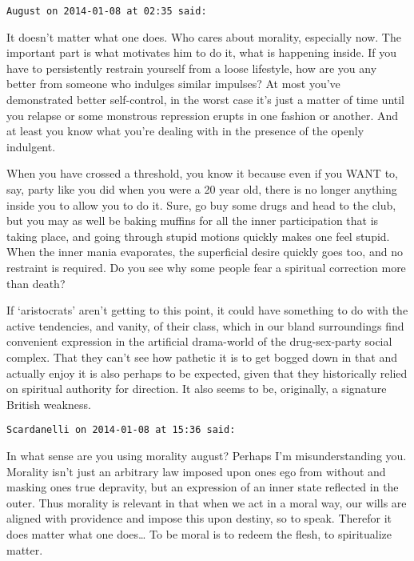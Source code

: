 \begin{footnotesize}
\begin{sffamily}
\hfill

\texttt{August on 2014-01-08 at 02:35 said: }

It doesn't matter what one does. Who cares about morality, especially now. The important part is what motivates him to do it, what is happening inside. If you have to persistently restrain yourself from a loose lifestyle, how are you any better from someone who indulges similar impulses? At most you've demonstrated better self-control, in the worst case it's just a matter of time until you relapse or some monstrous repression erupts in one fashion or another. And at least you know what you're dealing with in the presence of the openly indulgent.

When you have crossed a threshold, you know it because even if you WANT to, say, party like you did when you were a 20 year old, there is no longer anything inside you to allow you to do it. Sure, go buy some drugs and head to the club, but you may as well be baking muffins for all the inner participation that is taking place, and going through stupid motions quickly makes one feel stupid. When the inner mania evaporates, the superficial desire quickly goes too, and no restraint is required. Do you see why some people fear a spiritual correction more than death?

If `aristocrats' aren't getting to this point, it could have something to do with the active tendencies, and vanity, of their class, which in our bland surroundings find convenient expression in the artificial drama-world of the drug-sex-party social complex. That they can't see how pathetic it is to get bogged down in that and actually enjoy it is also perhaps to be expected, given that they historically relied on spiritual authority for direction. It also seems to be, originally, a signature British weakness.


\hfill

\texttt{Scardanelli on 2014-01-08 at 15:36 said: }

In what sense are you using morality august? Perhaps I'm misunderstanding you. Morality isn't just an arbitrary law imposed upon ones ego from without and masking ones true depravity, but an expression of an inner state reflected in the outer. Thus morality is relevant in that when we act in a moral way, our wills are aligned with providence and impose this upon destiny, so to speak. Therefor it does matter what one does… To be moral is to redeem the flesh, to spiritualize matter.


\hfill


\end{sffamily}
\end{footnotesize}
